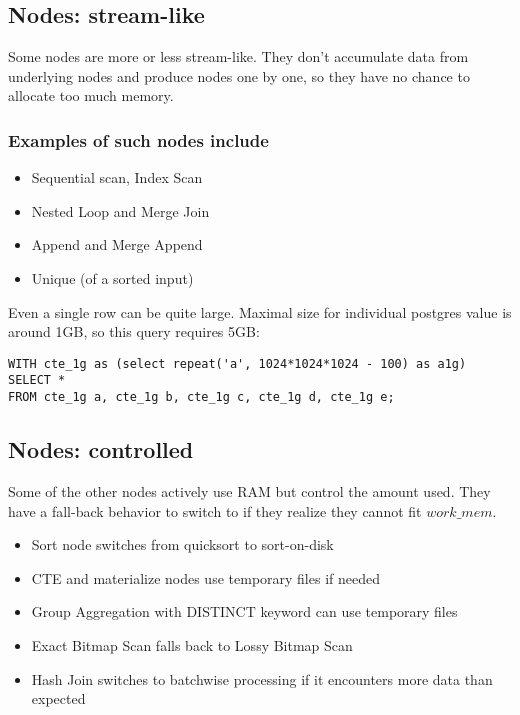 \documentclass[paper=letter, fontsize=12pt]{article}
\begin{document}
	\subsection{Nodes: stream-like}
	Some nodes are more or less stream-like. They don’t accumulate data from underlying nodes and produce nodes one by one, so they have no chance to allocate too much memory.
	\subsubsection{Examples of such nodes include}
	\begin{itemize}
		\item Sequential scan, Index Scan
		\item Nested Loop and Merge Join
		\item Append and Merge Append
		\item Unique (of a sorted input)
	\end{itemize}
	Even a single row can be quite large.
	Maximal size for individual postgres value is around 1GB, so this query requires 5GB:
	\begin{verbatim}
WITH cte_1g as (select repeat('a', 1024*1024*1024 - 100) as a1g)
SELECT *
FROM cte_1g a, cte_1g b, cte_1g c, cte_1g d, cte_1g e;
	\end{verbatim}

\subsection{Nodes: controlled}
Some of the other nodes actively use RAM but control the amount used.
They have a fall-back behavior to switch to if they realize they cannot fit $work\_mem$.
	\begin{itemize}
		\item Sort node switches from quicksort to sort-on-disk
		\item CTE and materialize nodes use temporary files if needed
		\item Group Aggregation with DISTINCT keyword can use temporary files
		\item Exact Bitmap Scan falls back to Lossy Bitmap Scan
		\item Hash Join switches to batchwise processing if it encounters more data than expected
	\end{itemize}
\end{document}
